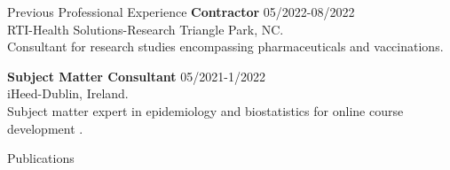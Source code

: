 \documentclass{resume} %
\begin{document}
\begin{rSection}{Previous Professional Experience}
   {\bf Contractor } \hfill {05/2022-08/2022}
   \\
   RTI-Health Solutions-Research Triangle Park, NC. 
   \\
   Consultant for research studies encompassing pharmaceuticals and vaccinations.

   {\bf Subject Matter Consultant } \hfill {05/2021-1/2022}
   \\
   iHeed-Dublin, Ireland. 
   \\
   Subject matter expert in epidemiology and biostatistics for online course development .
   
   \end{rSection}

\begin{rSection}{Publications}              

\begin{refsection}
   \nocite{*}   
   \printbibliography[title={\underline{First Authored Research}}]
\end{refsection}

\begin{refsection}
   \nocite{*}   
   \printbibliography[title={\underline{First Authored Non-Research}}]
\end{refsection}


\begin{refsection}[Coauthors]
   \nocite{*}   
   \printbibliography[title={\underline{Co-Authored}}]
\end{refsection}

\begin{refsection}[oped_co]
   \nocite{*}   
   \printbibliography[title={\underline{Co-Authored Non-Research}}]
\end{refsection}

\end{rSection}

\end{document}
